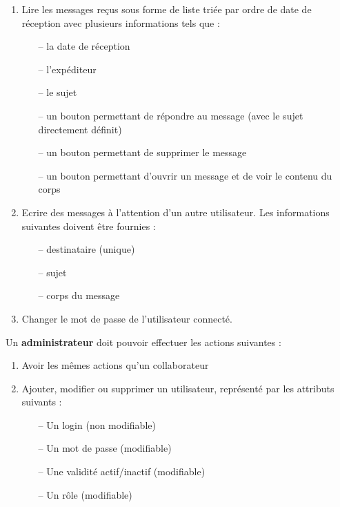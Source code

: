 \documentclass[12pt]{article}
\begin{document}
\begin{enumerate}
\item Lire les messages reçus sous forme de liste triée par ordre de date de réception avec plusieurs informations tels que :

\begin{itemize}
\item[--] la date de réception
\item[--] l'expéditeur
\item[--] le sujet
\item[--] un bouton permettant de répondre au message (avec le sujet directement définit)
\item[--] un bouton permettant de supprimer le message
\item[--] un bouton permettant d'ouvrir un message et de voir le contenu du corps 
\end{itemize} 

\item Ecrire des messages à l'attention d'un autre utilisateur. Les informations suivantes doivent être fournies :

\begin{itemize}
\item[--] destinataire (unique)
\item[--] sujet
\item[--] corps du message
\end{itemize} 

\item Changer le mot de passe de l'utilisateur connecté.

\end{enumerate}

Un \textbf{administrateur} doit pouvoir effectuer les actions suivantes : 

\begin{enumerate}
\item Avoir les mêmes actions qu'un collaborateur

\item Ajouter, modifier ou supprimer un utilisateur, représenté par les attributs suivants : 

\begin{itemize}
\item[--] Un login (non modifiable)
\item[--] Un mot de passe (modifiable)
\item[--] Une validité actif/inactif (modifiable)
\item[--] Un rôle (modifiable)
\end{itemize} 

\end{enumerate}
\end{document}
